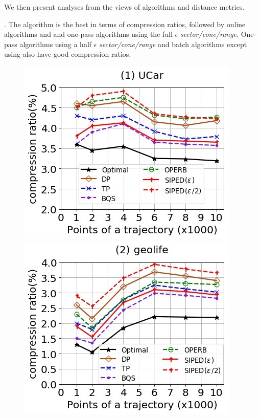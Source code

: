 We then present analyses from the views of \lsa algorithms and distance metrics.


. The \opt algorithm is the best in terms of compression ratios, followed by online algorithms \opwa and \bqsa and one-pass algorithms using the full $\epsilon$ \emph{sector/cone/range}. One-pass algorithms using a half $\epsilon$ \emph{sector/cone/range} and batch algorithms except \dpa using \dad also have good compression ratios.

\begin{figure}[tb!]
	\centering
	\includegraphics[scale=0.500]{Figures/Exp-PED-CR-size-service.jpg} 	\hspace{2ex}
	\includegraphics[scale=0.500]{Figures/Exp-PED-CR-size-geolife.jpg}	\hspace{2ex}

\end{figure}
